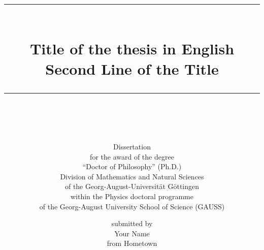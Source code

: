 




\newcommand{\HRule}{\rule{\linewidth}{0.5mm}}

\title{%
  \HRule\\[0.4cm]
  \Large
  Title of the thesis in English\\ Second Line of the Title
  \HRule\\[1.5cm]
}

\subtitle{%
Dissertation\\[1.0cm]
for the award of the degree\\[0.5ex]
``Doctor of Philosophy'' (Ph.D.)\\[0.5ex]
Division of Mathematics and Natural Sciences\\[0.5ex]
of the Georg-August-Universit\"at G\"ottingen\\[1.0cm]
within the Physics doctoral programme\\[0.5ex]
of the Georg-August University School of Science (GAUSS)\\[2.0cm]
}

\author{%
\large
submitted by\\[1.0cm]
\large
Your Name\\[0.5cm]
\large
from Hometown\\[2.0cm]
}

